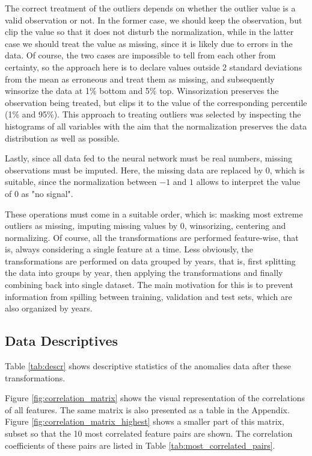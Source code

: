 		The correct treatment of the outliers depends on whether the outlier value is a valid observation or not. In the former case, we should keep the observation, but clip the value so that it does not disturb the normalization, while in the latter case we should treat the value as missing, since it is likely due to errors in the data. Of course, the two cases are impossible to tell from each other from certainty, so the approach here is to declare values outside 2 standard deviations from the mean as erroneous and treat them as missing, and subsequently winsorize the data at 1\% bottom and 5\% top. Winsorization preserves the observation being treated, but clips it to the value of the corresponding percentile (1\% and 95\%). This approach to treating outliers was selected by inspecting the histograms of all variables with the aim that the normalization preserves the data distribution as well as possible.    
		
		Lastly, since all data fed to the neural network must be real numbers, missing observations must be imputed. Here, the missing data are replaced by 0, which is suitable, since the normalization between $-1$ and $1$ allows to interpret the value of $0$ as "no signal".
		
		These operations must come in a suitable order, which is: masking most extreme outliers as missing, imputing missing values by $0$, winsorizing, centering and normalizing. Of course, all the transformations are performed feature-wise, that is, always considering a single feature at a time. Less obviously, the transformations are performed on data grouped by years, that is, first splitting the data into groups by year, then applying the transformations and finally combining back into single dataset. The main motivation for this is to prevent information from spilling between training, validation and test sets, which are also organized by years.  
	
	\subsection{Data Descriptives}   	
	
		Table \ref{tab:descr} shows descriptive statistics of the anomalies data after these transformations.
			
		Figure \ref{fig:correlation_matrix} shows the visual representation of the correlations of all features. The same matrix is also presented as a table in the Appendix. Figure \ref{fig:correlation_matrix_highest} shows a smaller part of this matrix, subset so that the 10 most correlated feature pairs are shown. The correlation coefficients of these pairs are listed in Table \ref{tab:most_correlated_pairs}.
	
